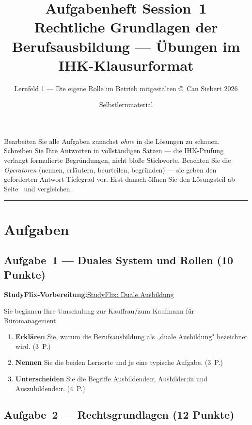 \documentclass[11pt, a4paper]{article}
\title{\vspace*{-1.5cm}\Huge\bfseries\color{bfwPrimaryDark}Aufgabenheft Session~1\\[0.4em]
  \large\color{bfwInkSoft}\textnormal{Rechtliche Grundlagen der Berufsausbildung --- Übungen im IHK-Klausurformat}}
\author{\textsf{Lernfeld 1 --- Die eigene Rolle im Betrieb mitgestalten \textperiodcentered{} \small\copyright\ Can Siebert\,\textperiodcentered\,2026}}
\date{Selbstlernmaterial}
\begin{document}
\maketitle
\thispagestyle{empty}

\begin{merksatz}[title={\bfseries So nutzen Sie dieses Aufgabenheft}]
Bearbeiten Sie alle Aufgaben zunächst \emph{ohne} in die Lösungen zu schauen. Schreiben
Sie Ihre Antworten in vollständigen Sätzen --- die IHK-Prüfung verlangt formulierte
Begründungen, nicht bloße Stichworte. Beachten Sie die \emph{Operatoren} (nennen,
erläutern, beurteilen, begründen) --- sie geben den geforderten Antwort-Tiefegrad vor.
Erst danach öffnen Sie den Lösungsteil ab Seite~\pageref{loesungen} und vergleichen.
\end{merksatz}

\tableofcontents
\vspace{1em}
\hrule

\section{Aufgaben}

\subsection*{Aufgabe~1 --- Duales System und Rollen (10 Punkte)}

\noindent\textbf{\color{bfwAccent}StudyFlix-Vorbereitung:}\enspace \href{https://studyflix.de/ausbildung/karriere-ausbildung/duale-ausbildung-4787}{StudyFlix: Duale Ausbildung}

\medskip
Sie beginnen Ihre Umschulung zur Kauffrau/zum Kaufmann für Büromanagement.

\begin{enumerate}[label=(\alph*)]
  \item \textbf{Erklären} Sie, warum die Berufsausbildung als „duale Ausbildung" bezeichnet wird. \hfill (3~P.)
  \item \textbf{Nennen} Sie die beiden Lernorte und je eine typische Aufgabe. \hfill (3~P.)
  \item \textbf{Unterscheiden} Sie die Begriffe Ausbildende:r, Ausbilder:in und Auszubildende:r. \hfill (4~P.)
\end{enumerate}

\subsection*{Aufgabe~2 --- Rechtsgrundlagen (12 Punkte)}
\end{document}
